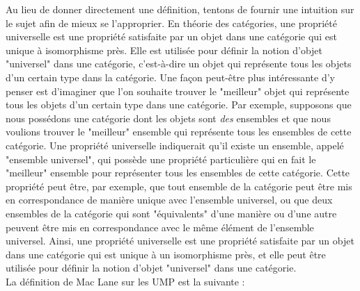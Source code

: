 \documentclass{article}
\begin{document}
Au lieu de donner directement une définition, tentons de fournir une intuition sur le sujet afin de mieux se l'approprier. En théorie des catégories, une propriété universelle est une propriété satisfaite par un objet dans une catégorie qui est unique à isomorphisme près. Elle est utilisée pour définir la notion d'objet "universel" dans une catégorie, c'est-à-dire un objet qui représente tous les objets d'un certain type dans la catégorie. Une façon peut-être plus intéressante d'y penser est d'imaginer que l'on souhaite trouver le "meilleur" objet qui représente tous les objets d'un certain type dans une catégorie. Par exemple, supposons que nous possédons une catégorie dont les objets sont \textit{des} ensembles et que nous voulions trouver le "meilleur" ensemble qui représente tous les ensembles de cette catégorie. Une propriété universelle indiquerait qu'il existe un ensemble, appelé "ensemble universel", qui possède une propriété particulière qui en fait le "meilleur" ensemble pour représenter tous les ensembles de cette catégorie. Cette propriété peut être, par exemple, que tout ensemble de la catégorie peut être mis en correspondance de manière unique avec l'ensemble universel, ou que deux ensembles de la catégorie qui sont "équivalents" d'une manière ou d'une autre peuvent être mis en correspondance avec le même élément de l'ensemble universel. Ainsi, une propriété universelle est une propriété satisfaite par un objet dans une catégorie qui est unique à un isomorphisme près, et elle peut être utilisée pour définir la notion d'objet "universel" dans une catégorie.\\

\noindent
La définition de Mac Lane sur les UMP est la suivante :
\end{document}
